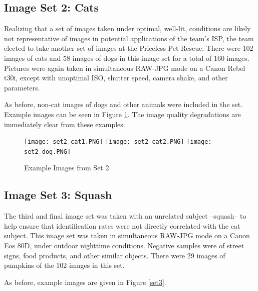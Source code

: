\documentclass{report}
\begin{document}
		\subsection{Image Set 2: Cats}
		Realizing that a set of images taken under optimal, well-lit, conditions are likely not representative of images in potential applications of the team's ISP, the team elected to take another set of images at the Priceless Pet Rescue. There were 102 images of cats and 58 images of dogs in this image set for a total of 160 images. Pictures were again taken in simultaneous RAW-JPG mode on a Canon Rebel t30i, except with unoptimal ISO, shutter speed, camera shake, and other parameters.
		
		As before, non-cat images of dogs and other animals were included in the set. Example images can be seen in Figure \ref{set2}. The image quality degradations are immediately clear from these examples.

		\begin{figure}[h]
			\begin{center}
				\caption{Example Images from Set 2}
				\label{set2}
				\texttt{[image: set2\_cat1.PNG]}
				\texttt{[image: set2\_cat2.PNG]}
				\texttt{[image: set2\_dog.PNG]}
			\end{center}
		\end{figure}		
		
		\subsection{Image Set 3: Squash}
		The third and final image set was taken with an unrelated subject --squash-- to help ensure that identification rates were not directly correlated with the cat subject. This image set was taken in simultaneous RAW-JPG mode on a Canon Eos 80D, under outdoor nighttime conditions. Negative samples were of street signs, food products, and other similar objects. There were 29 images of pumpkins of the 102 images in this set.
		
		As before, example images are given in Figure \ref{set3}.
		
\end{document}
